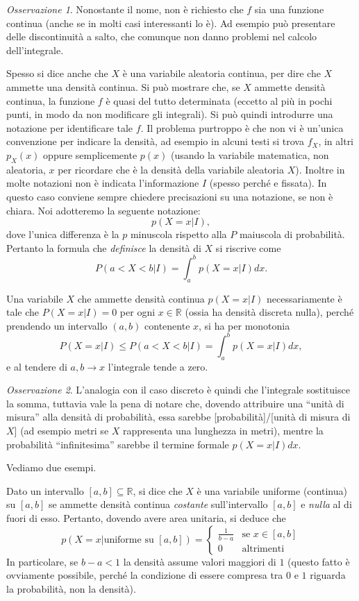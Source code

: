 \documentclass[
  italian,
  letterpaper,
]{book}
\newcommand{\R}{\mathbb{R}}
\theoremstyle{definition}
\theoremstyle{remark}
\newtheorem*{remark}{Osservazione}
\begin{document}
\begin{remark}
Nonostante il nome, non è richiesto che \(f\) sia una funzione continua
(anche se in molti casi interessanti lo è). Ad esempio può presentare
delle discontinuità a salto, che comunque non danno problemi nel calcolo
dell'integrale.
\end{remark}

Spesso si dice anche che \(X\) è una variabile aleatoria continua, per
dire che \(X\) ammette una densità continua. Si può mostrare che, se
\(X\) ammette densità continua, la funzione \(f\) è quasi del tutto
determinata (eccetto al più in pochi punti, in modo da non modificare
gli integrali). Si può quindi introdurre una notazione per identificare
tale \(f\). Il problema purtroppo è che non vi è un'unica convenzione
per indicare la densità, ad esempio in alcuni testi si trova \(f_X\), in
altri \(p_X(x)\) oppure semplicemente \(p(x)\) (usando la variabile
matematica, non aleatoria, \(x\) per ricordare che è la densità della
variabile aleatoria \(X\)). Inoltre in molte notazioni non è indicata
l'informazione \(I\) (spesso perché e fissata). In questo caso conviene
sempre chiedere precisazioni su una notazione, se non è chiara. Noi
adotteremo la seguente notazione: \[ p(X = x |I), \] dove l'unica
differenza è la \(p\) minuscola rispetto alla \(P\) maiuscola di
probabilità. Pertanto la formula che \emph{definisce} la densità di
\(X\) si riscrive come \[ P( a< X< b|I) = \int_a^b p(X=x|I) d x.\]

Una variabile \(X\) che ammette densità continua \(p(X=x|I)\)
necessariamente è tale che \(P(X=x|I) = 0\) per ogni \(x \in \R\) (ossia
ha densità discreta nulla), perché prendendo un intervallo \((a,b)\)
contenente \(x\), si ha per monotonia
\[ P(X = x | I) \le P(a<X<b | I ) = \int_a^b p(X=x|I) d x,\] e al
tendere di \(a, b \to x\) l'integrale tende a zero.

\begin{remark}
L'analogia con il caso discreto è quindi che l'integrale sostituisce la
somma, tuttavia vale la pena di notare che, dovendo attribuire una
``unità di misura'' alla densità di probabilità, essa sarebbe
{[}probabilità{]}/{[}unità di misura di \(X\){]} (ad esempio metri se
\(X\) rappresenta una lunghezza in metri), mentre la probabilità
``infinitesima'' sarebbe il termine formale \(p(X=x|I)dx\).
\end{remark}

Vediamo due esempi.

Dato un intervallo \([a,b] \subseteq \R\), si dice che \(X\) è una
variabile uniforme (continua) su \([a,b]\) se ammette densità continua
\emph{costante} sull'intervallo \([a,b]\) e \emph{nulla} al di fuori di
esso. Pertanto, dovendo avere area unitaria, si deduce che
\[ p(X=x| \text{uniforme su $[a,b]$}) = \begin{cases} \frac 1 {b-a} & \text{se $x \in [a,b] $}\\ 0 & \text{altrimenti} \end{cases} \]
In particolare, se \(b-a<1\) la densità assume valori maggiori di \(1\)
(questo fatto è ovviamente possibile, perché la condizione di essere
compresa tra \(0\) e \(1\) riguarda la probabilità, non la densità).
\end{document}

